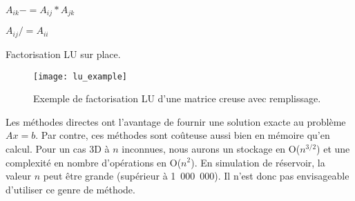 \begin{algorithm}
   {
     {
       {
        $A_{ik} -= A_{ij}*A_{jk}$
      }
    }

     {
      $A_{ij} /= A_{ii}$
    }
  }
  \caption{Factorisation LU sur place.}
  \label{algo:lu}
\end{algorithm}

\begin{figure}[!h]
  \centering
  \texttt{[image: lu\_example]}
  \caption{Exemple de factorisation LU d'une matrice creuse avec remplissage.}
  \label{fig:lu_example}
\end{figure}

Les méthodes directes ont l'avantage de fournir une solution exacte au problème $Ax=b$.
%
Par contre, ces méthodes sont coûteuse aussi bien en mémoire qu'en calcul.
%
Pour un cas 3D à $n$ inconnues, nous aurons un stockage en O($n^{3/2}$) et une complexité en nombre d'opérations en O($n^2$).
%
En simulation de réservoir, la valeur $n$ peut être grande (supérieur à 1~000~000).
%
Il n'est donc pas envisageable d'utiliser ce genre de méthode.
